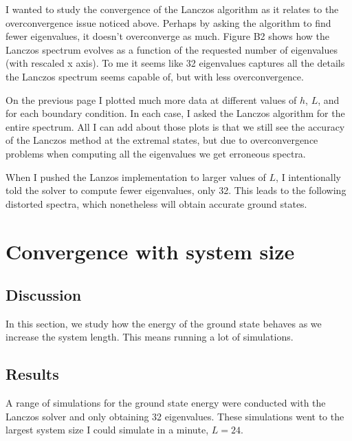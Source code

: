 \documentclass{article}
\begin{document}
I wanted to study the convergence of the Lanczos algorithm
as it relates to the overconvergence issue noticed above.
Perhaps by asking the algorithm to find fewer eigenvalues,
it doesn't overconverge as much.
Figure B2 shows how the Lanczos spectrum evolves as a function
of the requested number of eigenvalues (with rescaled x axis).
To me it seems like 32 eigenvalues captures all the details
the Lanczos spectrum seems capable of, but with less overconvergence.

{\centering





}

On the previous page I plotted much more data at different 
values of $h$, $L$, and for each boundary condition.
In each case, I asked the Lanczos algorithm for the
entire spectrum.
All I can add about those plots is that we still see
the accuracy of the Lanczos method at the extremal states,
but due to overconvergence problems when computing all the
eigenvalues we get erroneous spectra.

When I pushed the Lanzos implementation to larger values of $L$, I intentionally
told the solver to compute fewer eigenvalues, only 32.
This leads to the following distorted spectra,
which nonetheless will obtain accurate ground states.


{\centering



}

\newpage

\section{
Convergence with system size
}

\subsection{
Discussion
}

In this section, we study how the energy of the ground
state behaves as we increase the system length.
This means running a lot of simulations.

\subsection{
Results
}

A range of simulations for the ground state energy were
conducted with the Lanczos solver and only obtaining 
32 eigenvalues.
These simulations went to the largest system size I
could simulate in a minute, $L=24$.
\end{document}
